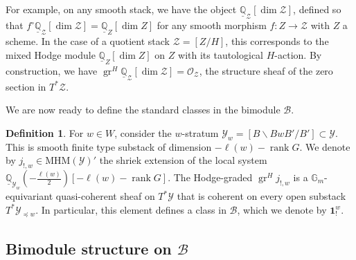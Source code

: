 \documentclass{amsart}
\newcommand{\bone}{\mathbf{1}}
\newcommand{\gr}{\operatorname{gr}}
\newcommand{\B}{\mathcal{B}}
\newcommand{\mhm}{\mathrm{MHM}}
\newcommand{\mc}[1]{\mathcal{#1}}
\newcommand{\mb}[1]{\mathbb{#1}}
\newcommand{\rank}{\mathop{\mathrm{rank}}}
\theoremstyle{definition}
\newtheorem{defi}[Thm]{Definition}
\numberwithin{equation}{section}
\begin{document}
For example, on any smooth stack, we have the object $\underline{\mb{Q}}_\mc{Z}[\dim \mc{Z}]$, defined so that $f^\circ \underline{\mb{Q}}_{\mc{Z}}[\dim \mc{Z}] = \underline{\mb{Q}}_Z[\dim Z]$ for any smooth morphism $f : Z \to \mc{Z}$ with $Z$ a scheme. In the case of a quotient stack $\mc{Z} = [Z/H]$, this corresponds to the mixed Hodge module $\underline{\mb{Q}}_Z[\dim Z]$ on $Z$ with its tautological $H$-action. By construction, we have $\gr^H \underline{\mb{Q}}_\mc{Z}[\dim \mc{Z}] = \mc{O}_\mc{Z}$, the structure sheaf of the zero section in $T^*\mc{Z}$.

We are now ready to define the standard classes in the bimodule $\B$.

%

\begin{defi}\label{def:standard-bimodule-classes}
For $w \in W$, consider the $w$-stratum $\mc{Y}_w = [B \backslash BwB' / B'] \subset \mc{Y}$. This is smooth finite type substack of dimension $-\ell(w) - \rank G$. We denote by $j_{!, w} \in \mhm(\mc{Y})'$ the shriek extension of the local system $\underline{\mb{Q}}_{\mc{Y}_w}(-\tfrac{\ell(w)}{2})[-\ell(w) - \rank G]$. The Hodge-graded $\gr^H j_{!, w}$ is a $\mathbb{G}_m$-equivariant quasi-coherent sheaf on $T^*\mathcal{Y}$ that is coherent on every open substack $T^*\mathcal{Y}_{\preceq w}$. In particular, this element defines a class in
$\B$, which we denote by $\bone_!^w$.
\end{defi}



\subsection{Bimodule structure on $\mathcal{B}$}
\end{document}

